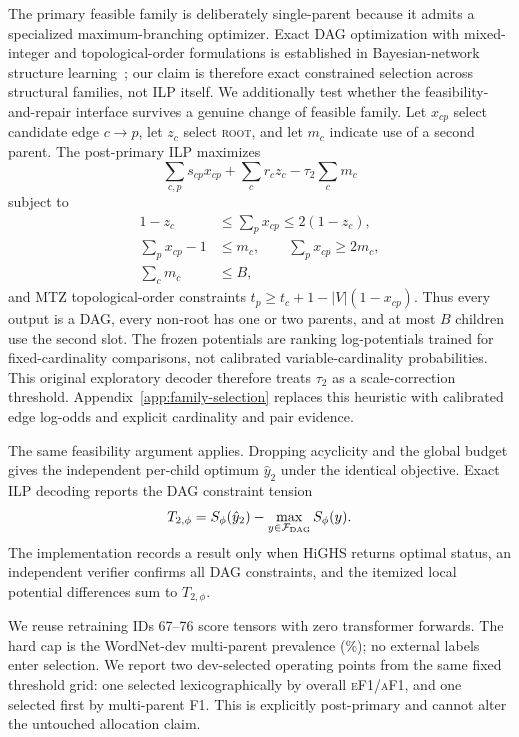 \documentclass[11pt]{article}
\newcommand{\rootnode}{\textsc{root}}
\newcommand{\ef}{\textsc{eF1}}
\newcommand{\af}{\textsc{aF1}}
\begin{document}
The primary feasible family is deliberately single-parent because it admits a specialized maximum-branching optimizer. Exact DAG optimization with mixed-integer and topological-order formulations is established in Bayesian-network structure learning~\citep{park2017bayesian,decampos2011efficient}; our claim is therefore exact constrained selection across structural families, not ILP itself. We additionally test whether the
feasibility-and-repair interface survives a genuine change of feasible family. Let
$x_{cp}$ select candidate edge $c\to p$, let $z_c$ select \rootnode{}, and let
$m_c$ indicate use of a second parent. The post-primary ILP maximizes
\begin{equation}
 \sum_{c,p}s_{cp}x_{cp}+\sum_c r_cz_c-\tau_2\sum_c m_c
\end{equation}
subject to
\begin{align}
1-z_c &\leq \sum_p x_{cp}\leq 2(1-z_c),\\
\sum_p x_{cp}-1 &\leq m_c,\qquad \sum_p x_{cp}\geq2m_c,\\
\sum_c m_c &\leq B,
\end{align}
and MTZ topological-order constraints
$t_p\geq t_c+1-|V|(1-x_{cp})$. Thus every output is a DAG, every non-root has
one or two parents, and at most $B$ children use the second slot. The frozen potentials are ranking log-potentials trained for fixed-cardinality comparisons, not calibrated variable-cardinality probabilities. This original exploratory decoder therefore treats $\tau_2$ as a scale-correction threshold. Appendix~\ref{app:family-selection} replaces this heuristic with calibrated edge log-odds and explicit cardinality and pair evidence.

The same feasibility argument applies. Dropping acyclicity and the global
budget gives the independent per-child optimum $\hat y_2$ under the identical
objective. Exact ILP decoding reports the DAG constraint tension
\begin{equation}
T_{2,\phi}=S_\phi(\hat y_2)-\max_{y\in\mathcal F_{\rm DAG}}S_\phi(y).
\end{equation}
The implementation records a result only when HiGHS returns optimal status, an
independent verifier confirms all DAG constraints, and the itemized local
potential differences sum to $T_{2,\phi}$.

We reuse retraining IDs 67--76 score tensors with zero transformer forwards. The hard
cap is the WordNet-dev multi-parent prevalence
(\DagCapFraction\%); no external labels enter selection. We report two
dev-selected operating points from the same fixed threshold grid: one selected
lexicographically by overall \ef/\af{}, and one selected first by multi-parent
F1. This is explicitly post-primary and cannot alter the untouched allocation
claim.
\end{document}
